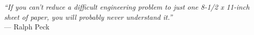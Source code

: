 \begin{epigrafe}
  \vspace*{20cm}
  \begin{otherlanguage}{english}
    \begin{flushright}
      \begin{SingleSpace}
        \textit{“If you can’t reduce a difficult engineering problem to just one 8-1/2 x 11-inch sheet of paper, you will probably never understand it.”} \\ 
        — Ralph Peck
      \end{SingleSpace}
    \end{flushright}
  \end{otherlanguage}
\end{epigrafe}
